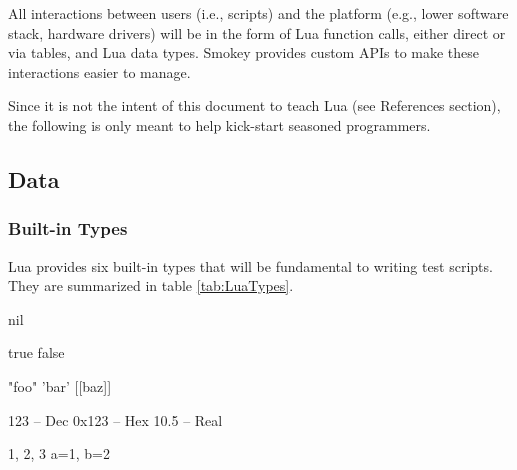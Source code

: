 All interactions between users (i.e., scripts) and the platform (e.g., lower
software stack, hardware drivers) will be in the form of Lua function calls,
either direct or via tables, and Lua  data types.  Smokey provides custom APIs
to make these interactions easier to manage.

Since it is not the intent of this document to teach Lua (see References
section), the following is only meant to help kick-start seasoned programmers.

\subsection{Data}

\subsubsection{Built-in Types}

Lua provides six built-in types that will be fundamental to writing test
scripts.  They are summarized in table \ref{tab:LuaTypes}.

\begin{lrbox}{\RightBoxA}
\begin{NestedLuaCode}[linewidth=1.25in]
nil
\end{NestedLuaCode}
\end{lrbox}

\begin{lrbox}{\RightBoxB}
\begin{NestedLuaCode}[linewidth=1.25in]
true
false
\end{NestedLuaCode}
\end{lrbox}

\begin{lrbox}{\RightBoxC}
\begin{NestedLuaCode}[linewidth=1.25in]
"foo"
'bar'
[[baz]]
\end{NestedLuaCode}
\end{lrbox}

\begin{lrbox}{\RightBoxD}
\begin{NestedLuaCode}[linewidth=1.25in]
123   -- Dec
0x123 -- Hex
10.5  -- Real
\end{NestedLuaCode}
\end{lrbox}

\begin{lrbox}{\RightBoxE}
\begin{NestedLuaCode}[linewidth=1.25in]
{ 1, 2, 3 }
{ a=1, b=2 }
\end{NestedLuaCode}
\end{lrbox}

